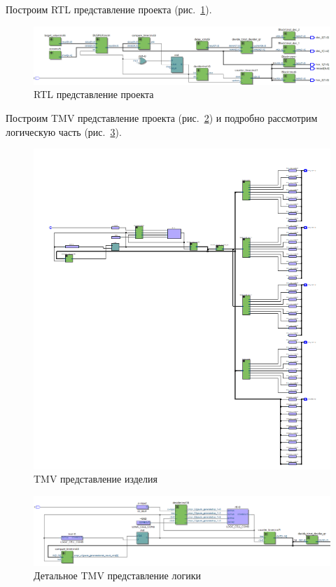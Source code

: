 \documentclass[a4paper,14pt]{article}
\begin{document}
Построим RTL представление проекта (рис.~\ref{fig:rtl}).

\begin{figure}[H]
	\centering
	\includegraphics[width=\linewidth]{image/rtl}
	\caption{RTL представление проекта}
	\label{fig:rtl}
\end{figure}

Построим TMV представление проекта (рис.~\ref{fig:tmv_1}) и подробно рассмотрим логическую часть (рис.~\ref{fig:tmv_2}).

\begin{figure}[H]
	\centering
	\includegraphics[width=\linewidth]{image/tmv_1}
	\caption{TMV представление изделия}
	\label{fig:tmv_1}
\end{figure}

\begin{figure}[H]
	\centering
	\includegraphics[width=\linewidth]{image/tmv_2}
	\caption{Детальное TMV представление логики}
	\label{fig:tmv_2}
\end{figure}
\end{document}
